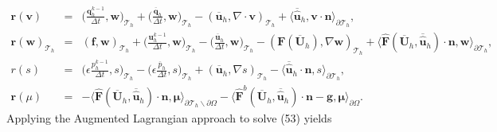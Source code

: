 \documentclass[11pt]{article}
\begin{document}
\begin{equation}
\begin{array}{rcl}
 \bm{r}(\bm{v}) & = & \displaystyle \Big(\frac{\bm{q}^{k-1}_h}{\Delta t}, \bm{w} \Big)_{\mathcal{T}_h} + \Big(\frac{\overline{\bm{q}}_h}{\Delta t}, \bm{w} \Big)_{\mathcal{T}_h} - (\overline{\bm{u}}_h, \nabla \cdot \bm{v})_{\mathcal{T}_h} + \langle \overline{\widehat{\bm{u}}}_h, \bm{v} \cdot \bm{n} \rangle_{\partial \mathcal{T}_h},  \\[2ex]
\bm{r}(\bm{w})_{\mathcal{T}_h} & = & (\bm{f}, \bm{w})_{\mathcal{T}_h} + \displaystyle \Big(\frac{\bm{u}_h^{k-1}}{\Delta t}, \bm{w} \Big)_{\mathcal{T}_h} - \displaystyle \Big(\frac{\overline{\bm{u}}_h}{\Delta t}, \bm{w} \Big)_{\mathcal{T}_h} - (\bm{F} (\overline{\bm{U}}_h), \nabla \bm{w})_{\mathcal{T}_h} + \langle \widehat{\bm{F}} (\overline{\bm{U}}_h, \overline{\widehat{\bm{u}}}_h) \cdot \bm{n}, \bm{w} \rangle_{\partial \mathcal{T}_h} , \\[2ex]
r(s) & = &  \displaystyle  \Big(\epsilon \frac{p^{k-1}_h}{\Delta t}, s\Big)_{\mathcal{T}_h} -   \Big(\epsilon \frac{\overline{p}_h}{\Delta t}, s\Big)_{\mathcal{T}_h} + (\overline{\bm{u}}_h, \nabla s)_{\mathcal{T}_h} - \langle \overline{\widehat{\bm{u}}}_h \cdot \bm{n},s \rangle_{\partial \mathcal{T}_h} ,\\[2ex]
\bm{r}(\mu) & = & - \langle \widehat{\bm{F}} (\overline{\bm{U}}_h, \overline{\widehat{\bm{u}}}_h) \cdot \bm{n}, \bm{\mu} \rangle_{\partial \mathcal{T}_h \backslash \partial \Omega} - \langle \widehat{\bm{F}}^b(\overline{\bm{U}}_h,\overline{\widehat{\bm{u}}}_h) \cdot \bm{n} - \bm{g}, \bm{\mu} \rangle_{\partial \Omega} .
\end{array}
\end{equation}
Applying the Augmented Lagrangian approach to solve (53) yields
\end{document}
